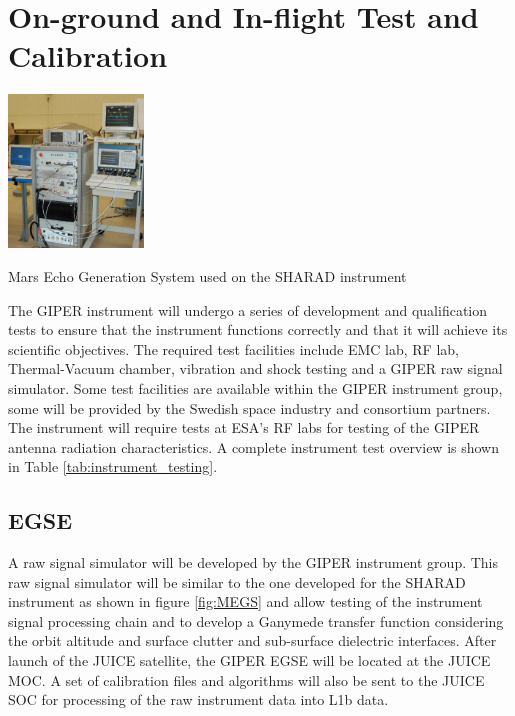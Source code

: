 \section{On-ground and In-flight Test and Calibration}
%
\begin{floatingfigure}[r]{0.3\textwidth}
\centering
\includegraphics[width=0.27\textwidth]{Figures/MEGS}
\caption[caption]{Mars Echo Generation System used on the SHARAD instrument\cite{MEGS}}
\label{fig:MEGS}
\end{floatingfigure}
%
The \ac{GIPER} instrument will undergo a series of development and qualification tests to ensure that the instrument functions correctly and that it will achieve its scientific objectives. 
%
%
The required test facilities include \ac{EMC} lab, \ac{RF} lab, Thermal-Vacuum chamber, vibration and shock testing and a \ac{GIPER} raw signal simulator. Some test facilities are available within the \ac{GIPER} instrument group, some will be provided by the Swedish space industry and consortium partners. The instrument will require tests at ESA's \ac{RF} labs for testing of the \ac{GIPER} antenna radiation characteristics. A complete instrument test overview is shown in Table \ref{tab:instrument_testing}.
%
\vspace{15mm}
%
\subsection{EGSE}
A raw signal simulator will be developed by the \ac{GIPER} instrument group. This raw signal simulator will be similar to the one developed for the \ac{SHARAD} instrument\cite{Giovanni} as shown in figure \ref{fig:MEGS} and allow testing of the instrument signal processing chain and to develop a Ganymede transfer function considering the orbit altitude and surface clutter and sub-surface dielectric interfaces. After launch of the JUICE satellite, the \ac{GIPER} \ac{EGSE} will be located at the JUICE \ac{MOC}. A set of calibration files and algorithms will also be sent to the JUICE \ac{SOC} for processing of the raw instrument data into L1b data.
%
%
